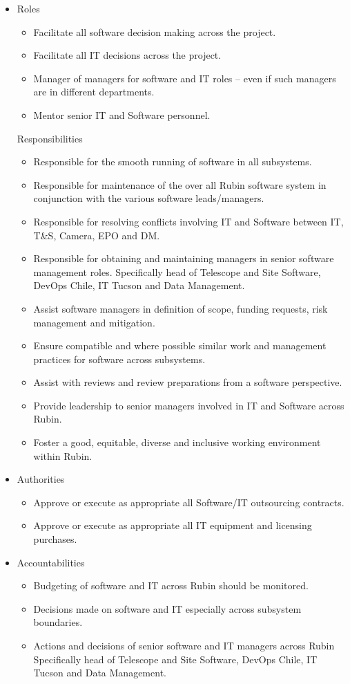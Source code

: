 \begin{itemize}
\item Roles
\begin{itemize}
\item Facilitate all software decision making across the project.
\item Facilitate all IT decisions across the project.
\item Manager of managers for software and IT roles – even if such managers are in different
departments.
\item Mentor senior IT and Software personnel.
\end{itemize}
Responsibilities
\begin{itemize}
\item Responsible for the smooth running of software in all subsystems.
\item Responsible for maintenance of the over all Rubin software system in conjunction  with the various software leads/managers.
\item Responsible for resolving conflicts involving IT and Software between IT, T\&S, Camera, EPO  and DM.
\item Responsible for obtaining and maintaining managers in senior software management roles. Specifically head of Telescope and Site Software, DevOps Chile, IT Tucson and Data Management.
\item Assist software managers in definition of scope, funding requests, risk management
and mitigation.
\item Ensure compatible and where possible similar work and management practices for
software across subsystems.
\item Assist with reviews and review preparations from a software perspective.
\item Provide leadership to senior managers involved in IT and Software across Rubin.
\item Foster a good, equitable, diverse and inclusive working environment within Rubin.
\end{itemize}

\item Authorities
\begin{itemize}
\item Approve or execute as appropriate all Software/IT outsourcing contracts.
\item Approve or execute as appropriate all IT equipment and licensing purchases.
\end{itemize}
\item Accountabilities
\begin{itemize}
\item Budgeting of software and IT across Rubin should be monitored.
\item Decisions made on software and IT especially across subsystem boundaries.
\item Actions and decisions of senior software and IT managers across Rubin Specifically head of Telescope and Site Software, DevOps Chile,  IT Tucson and Data Management.

\end{itemize}
\end{itemize}
